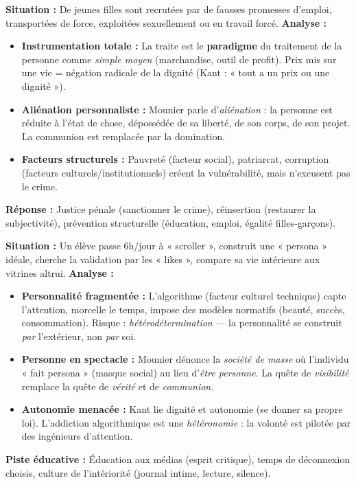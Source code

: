 \documentclass[11pt]{article}
\newcommand{\cle}[1]{{\popxbold\color{popdark}#1}}
\begin{document}
\begin{exemplebox}
\textbf{Situation :} De jeunes filles sont recrutées par de fausses promesses d'emploi, transportées de force, exploitées sexuellement ou en travail forcé.
\textbf{Analyse :}
\begin{itemize}
    \item \textbf{Instrumentation totale :} La traite est le \textbf{paradigme} du traitement de la personne comme \emph{simple moyen} (marchandise, outil de profit). Prix mis sur une vie = négation radicale de la \cle{dignité} (Kant : « tout a un prix ou une dignité »).
    \item \textbf{Aliénation personnaliste :} Mounier parle d'\emph{aliénation} : la personne est réduite à l'état de chose, dépossédée de sa liberté, de son corps, de son projet. La \cle{communion} est remplacée par la \cle{domination}.
    \item \textbf{Facteurs structurels :} Pauvreté (facteur social), patriarcat, corruption (facteurs culturels/institutionnels) créent la vulnérabilité, mais n'excusent pas le crime.
\end{itemize}
\textbf{Réponse :} Justice pénale (sanctionner le crime), réinsertion (restaurer la subjectivité), prévention structurelle (éducation, emploi, égalité filles-garçons).
\end{exemplebox}

\begin{exemplebox}
\textbf{Situation :} Un élève passe 6h/jour à « scroller », construit une « persona » idéale, cherche la validation par les « likes », compare sa vie intérieure aux vitrines altrui.
\textbf{Analyse :}
\begin{itemize}
    \item \textbf{Personnalité fragmentée :} L'algorithme (facteur culturel technique) capte l'attention, morcelle le temps, impose des modèles normatifs (beauté, succès, consommation). Risque : \emph{hétérodétermination} — la personnalité se construit \emph{par} l'extérieur, non \emph{par} soi.
    \item \textbf{Personne en spectacle :} Mounier dénonce la \emph{société de masse} où l'individu « fait persona » (masque social) au lieu d'\emph{être personne}. La quête de \emph{visibilité} remplace la quête de \emph{vérité} et de \emph{communion}.
    \item \textbf{Autonomie menacée :} Kant lie dignité et \cle{autonomie} (se donner sa propre loi). L'addiction algorithmique est une \emph{hétéronomie} : la volonté est pilotée par des ingénieurs d'attention.
\end{itemize}
\textbf{Piste éducative :} Éducation aux médias (esprit critique), temps de déconnexion choisis, culture de l'intériorité (journal intime, lecture, silence).
\end{exemplebox}
\end{document}
